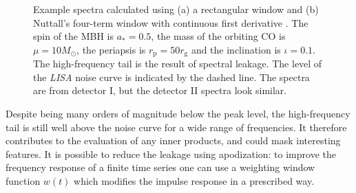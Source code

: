\documentclass[useAMS,usedcolumn,usegraphicx,usenatbib]{mn2e}
\newcommand{\sub}[1]{\ensuremath{_\mathrm{#1}}}
\begin{document}
\begin{figure}
  \begin{center}
    \quad
    \caption{Example spectra calculated using (a) a rectangular window and (b) Nuttall's four-term window with continuous first derivative \citep{Nuttall1981}. The spin of the MBH is $a_\ast = 0.5$, the mass of the orbiting CO is $\mu = 10 M_\odot$, the periapsis is $r\sub{p} = 50 r\sub{g}$ and the inclination is $\iota = 0.1$. The high-frequency tail is the result of spectral leakage. The level of the \textit{LISA} noise curve is indicated by the dashed line. The spectra are from detector I, but the detector II spectra look similar.\label{fig:Windowing}}
  \end{center}
\end{figure}

Despite being many orders of magnitude below the peak level, the high-frequency tail is still well above the noise curve for a wide range of frequencies. It therefore contributes to the evaluation of any inner products, and could mask interesting features. It is possible to reduce the leakage using apodization: to improve the frequency response of a finite time series one can use a weighting window function $w(t)$ which modifies the impulse response in a prescribed way.
\end{document}
